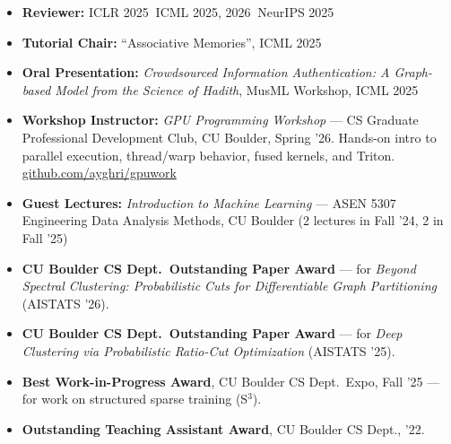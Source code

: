 \vspace{4pt}
\small
\begin{itemize}
\setlength{\itemindent}{0.9em}
    \item \textbf{Reviewer:} ICLR 2025$\;$\textbullet$\;$ICML 2025, 2026$\;$\textbullet$\;$NeurIPS 2025
    \item \textbf{Tutorial Chair:} ``Associative Memories'', ICML 2025
    \item \textbf{Oral Presentation:} \textit{Crowdsourced Information Authentication: A Graph-based Model from the Science of Hadith}, MusML Workshop, ICML 2025
    \item \textbf{Workshop Instructor:} \textit{GPU Programming Workshop} --- CS Graduate Professional Development Club, CU Boulder, Spring '26. Hands-on intro to parallel execution, thread/warp behavior, fused kernels, and Triton. \href{https://github.com/ayghri/gpuwork}{github.com/ayghri/gpuwork}
    \item \textbf{Guest Lectures:} \textit{Introduction to Machine Learning} --- ASEN 5307 Engineering Data Analysis Methods, CU Boulder (2 lectures in Fall '24, 2 in Fall '25)
\end{itemize}

\vspace{0.6em}
\vspace{4pt}
\small
\begin{itemize}
\setlength{\itemindent}{0.9em}
    \item \textbf{CU Boulder CS Dept.\ Outstanding Paper Award} --- for \textit{Beyond Spectral Clustering: Probabilistic Cuts for Differentiable Graph Partitioning} (AISTATS '26).
    \item \textbf{CU Boulder CS Dept.\ Outstanding Paper Award} --- for \textit{Deep Clustering via Probabilistic Ratio-Cut Optimization} (AISTATS '25).
    \item \textbf{Best Work-in-Progress Award}, CU Boulder CS Dept.\ Expo, Fall '25 --- for work on structured sparse training (S$^3$).
    \item \textbf{Outstanding Teaching Assistant Award}, CU Boulder CS Dept., '22.
\end{itemize}

